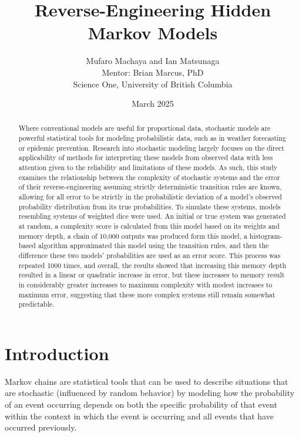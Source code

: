 \documentclass[12pt]{article}
\title{Reverse-Engineering Hidden Markov Models}
\author{Mufaro Machaya and Ian Matsunaga\\Mentor: Brian Marcus, PhD\\Science One, University of British Columbia}
\date{March 2025}
\begin{document}
\begin{titlepage}
\maketitle
\end{titlepage}
\newpage
{}

\begin{abstract}
Where conventional models are useful for proportional data, stochastic models are powerful statistical tools for modeling probabilistic data, such as in weather forecasting or epidemic prevention. Research into stochastic modeling largely focuses on the direct applicability of methods for interpreting these models from observed data with less attention given to the reliability and limitations of these models. As such, this study examines the relationship between the complexity of stochastic systems and the error of their reverse-engineering assuming strictly deterministic transition rules are known, allowing for all error to be strictly in the probabilistic deviation of a model's observed probability distribution from its true probabilities. To simulate these systems, models resembling systems of weighted dice were used. An initial or true system was generated at random, a complexity score is calculated from this model based on its weights and memory depth, a chain of 10,000 outputs was produced form this model, a histogram-based algorithm approximated this model using the transition rules, and then the difference these two models' probabilities are used as an error score. This process was repeated 1000 times, and overall, the results showed that increasing this memory depth resulted in a linear or quadratic increase in error, but these increases to memory result in considerably greater increases to maximum complexity with modest increases to maximum error, suggesting that these more complex systems still remain somewhat predictable.
\end{abstract}

\newpage
\section{Introduction}
Markov chains are statistical tools that can be used to describe situations that are stochastic (influenced by random behavior) by modeling how the probability of an event occurring depends on both the specific probability of that event within the context in which the event is occurring and all events that have occurred previously\cite{MARKOVTEXTBOOK}. 
\end{document}
